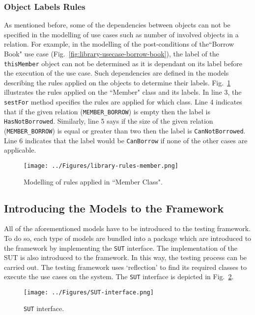 \subsubsection{Object Labels Rules}
\label{sec:subsidiary-models-object-labels}
As mentioned before, some of the dependencies between objects can not be specified in the modelling of use cases such as number of involved objects in a relation. For example, in the modelling of the post-conditions of  the``Borrow Book" use case (Fig.~\ref{fig:library-usecase-borrow-book}), the label of the \texttt{thisMember}  object can not be determined as it is dependant on its label before the execution of the use case. 
Such dependencies are defined in the models describing the rules applied on the objects to determine their labels. Fig.~\ref{fig:library-rules-member} illustrates the rules applied on the ``Member" class and its labels. In line 3, the \texttt{sestFor} method specifies the rules are applied for which class. Line 4 indicates that if the given relation (\texttt{MEMBER\_BORROW}) is empty then the label is \texttt{HasNotBorrowed}. Similarly, line 5 says if the size of the given relation (\texttt{MEMBER\_BORROW}) is equal or greater than two then the label is \texttt{CanNotBorrowed}. Line 6 indicates that the label would be \texttt{CanBorrow} if none of the other cases are applicable.

\begin{figure}[h]
\centering
\texttt{[image: ../Figures/library-rules-member.png]}
\caption{Modelling of rules applied in ``Member Class".}
\label{fig:library-rules-member}
\end{figure}

\subsection{Introducing the Models to the Framework}
\label{sec:create-test model-introducing-models}
All of the aforementioned models have to be introduced to the testing framework. To do so, each type of models are bundled into a package which are introduced to the framework by implementing the \texttt{SUT} interface. The implementation of the SUT is also introduced to the framework. In this way, the testing process can be carried out.
The testing framework uses `reflection' to find its required classes to execute the use cases on the system. The \texttt{SUT} interface is depicted in Fig.~\ref{fig:SUT-interface}. 

\begin{figure}[h]
\centering
\texttt{[image: ../Figures/SUT-interface.png]}
\caption{\texttt{SUT} interface.}
\label{fig:SUT-interface}
\end{figure}

